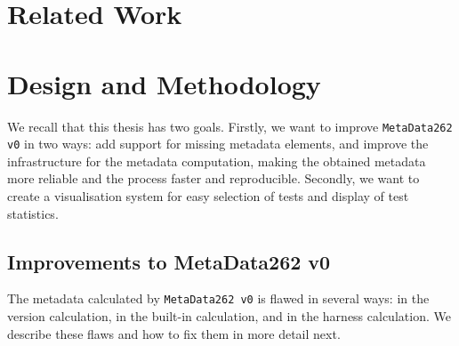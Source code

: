 \documentclass[runningheads]{llncs}
\begin{document}
\section{Related Work}
\label{sec:Related Work}



\section{Design and Methodology}
\label{sec:Design and Methodology}



We recall that this thesis has two goals. Firstly, we want to improve \texttt{MetaData262 v0} in two ways: add support for missing metadata elements, and improve the infrastructure for the metadata computation, making the obtained metadata more reliable and the process faster and reproducible. Secondly, we want to create a visualisation system for easy selection of tests and display of test statistics.


\subsection{Improvements to MetaData262 v0}
\label{sub:improvements_to_metadata262_v0}


The metadata calculated by \texttt{MetaData262 v0} is flawed in several ways: in the version calculation, in the built-in calculation, and in the harness calculation. We describe these flaws and how to fix them in more detail next.
\end{document}
